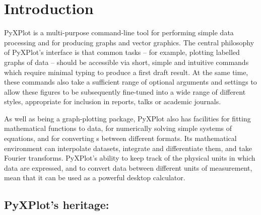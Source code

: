 %
%
%
%
%



\chapter{Introduction}

\label{ch:introduction}

{\sc PyXPlot} is a multi-purpose command-line tool for performing simple data
processing and for producing graphs and vector graphics. The central philosophy
of PyXPlot's interface is that common tasks -- for example, plotting labelled
graphs of data -- should be accessible via short, simple and intuitive commands
which require minimal typing to produce a first draft result.  At the same
time, these commands also take a sufficient range of optional arguments and
settings to allow these figures to be subsequently fine-tuned into a wide range
of different styles, appropriate for inclusion in reports, talks or academic
journals.

As well as being a graph-plotting package, PyXPlot also has facilities for
fitting mathematical functions to data, for numerically solving simple systems
of equations, and for converting \datafile s between different formats.  Its
mathematical environment can interpolate datasets, integrate and differentiate
them, and take Fourier transforms.  PyXPlot's ability to keep track of the
physical units in which data are expressed, and to convert data between
different units of measurement, mean that it can be used as a powerful desktop
calculator.

\section{PyXPlot's heritage: \gnuplot}

